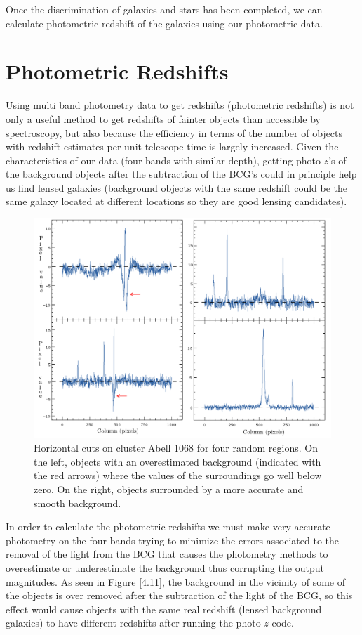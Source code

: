 Once the discrimination of galaxies and stars has been completed, we can calculate photometric redshift of the galaxies using our photometric data.

\section{Photometric Redshifts}

Using multi band photometry data to get redshifts (photometric redshifts) is not only a useful method to get redshifts of fainter objects than accessible by spectroscopy, but also because the efficiency in terms of the number of objects with redshift estimates per unit telescope time is largely increased. Given the characteristics of our data (four bands with similar depth), getting photo-$z$'s of the background objects after the subtraction of the BCG's could in principle help us find lensed galaxies (background objects with the same redshift could be the same galaxy located at different locations so they are good lensing candidates).

\begin{figure}[H]
\centering
\includegraphics[width=15cm]{images/horizontal_cuts.png}
\caption[Horizontal cuts to show overestimated background on Abell 1068]{Horizontal cuts on cluster Abell 1068 for four random regions. On the left, objects with an overestimated background (indicated with the red arrows) where the values of the surroundings go well below zero. On the right, objects surrounded by a more accurate and smooth background.}
\end{figure}

In order to calculate the photometric redshifts we must make very accurate photometry on the four bands trying to minimize the errors associated to the removal of the light from the BCG that causes the photometry methods to overestimate or underestimate the background thus corrupting the output magnitudes. As seen in Figure [4.11], the background in the vicinity of some of the objects is over removed after the subtraction of the light of the BCG, so this effect would cause objects with the same real redshift (lensed background galaxies) to have different redshifts after running the photo-$z$ code.

